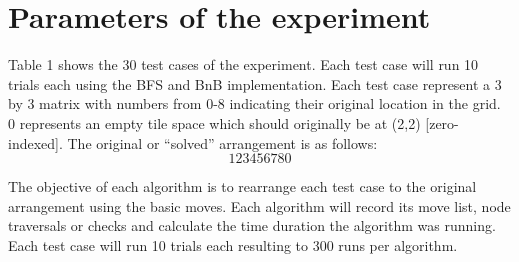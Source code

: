 \section{Parameters of the experiment}

\par Table 1 shows the 30 test cases of the experiment. Each test case will run 10 trials each using the BFS and BnB implementation. Each test case represent a 3 by 3 matrix with numbers from 0-8 indicating their original location in the grid. 0 represents an empty tile space which should originally be at (2,2) [zero-indexed]. The original or ``solved'' arrangement is as follows:
$$
1 2 3 4 5 6 7 8 0
$$
\par The objective of each algorithm is to rearrange each test case to the original arrangement using the basic moves. Each algorithm will record its move list, node traversals or checks and calculate the time duration the algorithm was running. Each test case will run 10 trials each resulting to 300 runs per algorithm.

